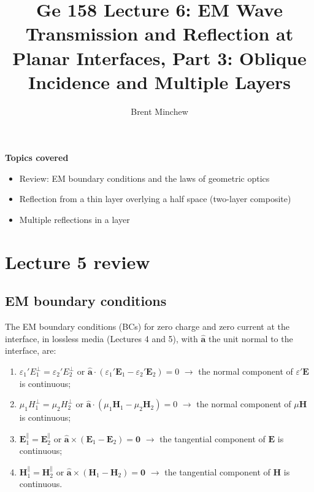 \documentclass[11pt, oneside]{article}
\title{Ge 158 Lecture 6: EM Wave Transmission and Reflection at Planar Interfaces, Part 3: Oblique Incidence and Multiple Layers}
\author{Brent Minchew}
\date{}
\begin{document}
\maketitle

\noindent\textbf{Topics covered}
\begin{itemize}
	\item Review: EM boundary conditions and the laws of geometric optics
	\item Reflection from a thin layer overlying a half space (two-layer composite)
	\item Multiple reflections in a layer
\end{itemize}

\section{Lecture 5 review}

\subsection{EM boundary conditions}

The EM boundary conditions (BCs) for zero charge and zero current at the interface, in lossless media (Lectures 4 and 5), with $\hat{\mathbf{a}}$ the unit normal to the interface, are:
\begin{enumerate}
	\item $\varepsilon_1'E_1^\perp = \varepsilon_2'E_2^\perp$ \quad or \quad $\hat{\mathbf{a}}\cdot\left(\varepsilon_1'\mathbf{E}_1 - \varepsilon_2'\mathbf{E}_2\right) = 0$ \quad $\rightarrow$ the normal component of $\varepsilon'\mathbf{E}$ is continuous;
	\item $\mu_1H_1^\perp = \mu_2H_2^\perp$ \quad or \quad $\hat{\mathbf{a}}\cdot\left(\mu_1\mathbf{H}_1 - \mu_2\mathbf{H}_2\right) = 0$ \quad $\rightarrow$ the normal component of $\mu\mathbf{H}$ is continuous;
	\item $\mathbf{E}_1^\parallel = \mathbf{E}_2^\parallel$ \quad or \quad $\hat{\mathbf{a}}\times\left(\mathbf{E}_1 - \mathbf{E}_2\right) = \mathbf{0}$ \quad $\rightarrow$ the tangential component of $\mathbf{E}$ is continuous;
	\item $\mathbf{H}_1^\parallel = \mathbf{H}_2^\parallel$ \quad or \quad $\hat{\mathbf{a}}\times\left(\mathbf{H}_1 - \mathbf{H}_2\right) = \mathbf{0}$ \quad $\rightarrow$ the tangential component of $\mathbf{H}$ is continuous.
\end{enumerate}
\end{document}
